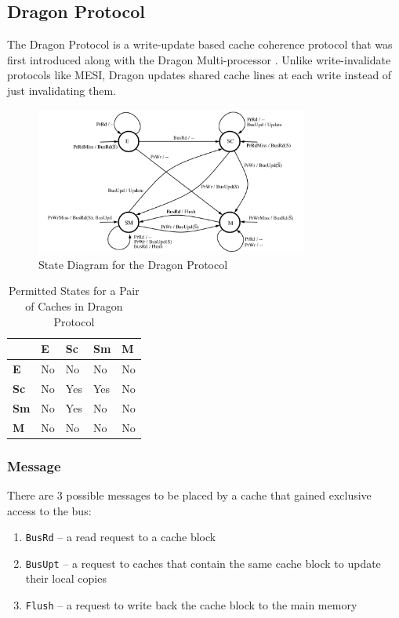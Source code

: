 \documentclass[nonacm,acmsmall,screen,11pt]{acmart}
\begin{document}
\subsection{Dragon Protocol}
The Dragon Protocol is a write-update based cache coherence protocol that was first introduced along with the Dragon Multi-processor \cite{atkinson1987dragon}. Unlike write-invalidate protocols like MESI, Dragon updates shared cache lines at each write instead of just invalidating them.

\begin{figure}[htb!]
  \centering
  \includegraphics[width=0.8\textwidth]{dragon}
  \caption{State Diagram for the Dragon Protocol}
\end{figure}

\begin{table}[htb!]
  \centering
  \caption{Permitted States for a Pair of Caches in Dragon Protocol}
  \label{tab:dragon}
  \begin{tabular}{|l|l|l|l|l|}
    \hline
                & \textbf{E} & \textbf{Sc} & \textbf{Sm} & \textbf{M} \\ \hline
    \textbf{E}  & No         & No          & No          & No         \\ \hline
    \textbf{Sc} & No         & Yes         & Yes         & No         \\ \hline
    \textbf{Sm} & No         & Yes         & No          & No         \\ \hline
    \textbf{M}  & No         & No          & No          & No         \\ \hline
  \end{tabular}
\end{table}

\subsubsection{Message}
There are 3 possible messages to be placed by a cache that gained exclusive access to the bus:
\begin{enumerate}
  \item \texttt{BusRd} -- a read request to a cache block
  \item \texttt{BusUpt} -- a request to caches that contain the same cache block to update their local copies
  \item \texttt{Flush} -- a request to write back the cache block to the main memory
\end{enumerate}
\end{document}
